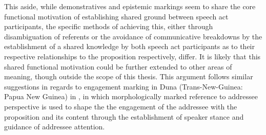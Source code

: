 This aside, while demonstratives and epistemic markings seem to share the core functional motivation of establishing shared ground between speech act participants, the specific methods of achieving this, either through disambiguation of referents or the avoidance of communicative breakdowns by the establishment of a shared knowledge by both speech act participants as to their respective relationships to the proposition respectively, differ. It is likely that this shared functional motivation could be further extended to other areas of meaning, though outside the scope of this thesis. This argument follows similar suggestions in regards to engagement marking in Duna (Trans-New-Guinea: Papua New Guinea) in , in which morphologically marked reference to addressee perspective is used to shape the the engagement of the addressee with the proposition and its content through the establishment of speaker stance and guidance of addressee attention.


